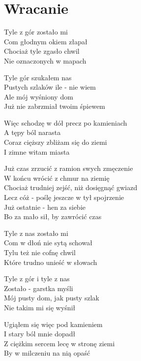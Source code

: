 \section{Wracanie}
\begin{text}
Tyle z gór zostało mi\\
Com głodnym okiem złapał\\
Chociaż tyle zgasło chwil\\
Nie oznaczonych w mapach

Tyle gór szukałem nas\\
Pustych szlaków ile - nie wiem\\
Ale mój wyśniony dom\\
Już nie zabrzmiał twoim śpiewem

Więc schodzę w dół precz po kamieniach\\
A tępy ból narasta\\
Coraz cięższy zbliżam się do ziemi\\
I zimne witam miasta

Już czas zrzucić z ramion swych zmęczenie\\
W końcu wrócić z chmur na ziemię\\
Chociaż trudniej zejść, niż dosięgnąć gwiazd\\
Lecz cóż - poślę jeszcze w tył spojrzenie\\
Już ostatnie - hen za siebie\\
Bo za mało sił, by zawrócić czas

Tyle z nas zostało mi\\
Com w dłoń nie sytą schował\\
Tylu też nie cofnę chwil\\
Które trudno unieść w słowach

Tyle z gór i tyle z nas\\
Zostało - garstka myśli\\
Mój pusty dom, jak pusty szlak\\
Nie takim mi się wyśnił

Ugiąłem się więc pod kamieniem\\
I stary ból mnie dopadł\\
Z ciężkim sercem lecę w stronę ziemi\\
By w milczeniu na nią opaść
\end{text}
